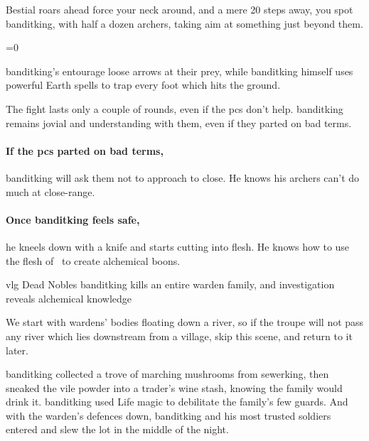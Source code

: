 \begin{boxtext}
  Bestial roars ahead force your neck around, and a mere 20 \glspl{step} away, you spot \gls{banditking}, with half a dozen archers, taking aim at something just beyond them.
\end{boxtext}

\ifnum\value{temperature}=0
  \griffin
\else
  \basilisk
\fi

\Gls{banditking}'s entourage loose arrows at their prey, while \gls{banditking} himself uses powerful Earth spells to trap every foot which hits the ground.

The fight lasts only a couple of rounds, even if the \glspl{pc} don't help.
\Gls{banditking} remains jovial and understanding with them, even if they parted on bad terms.

\paragraph{If the \glspl{pc} parted on bad terms,}
\gls{banditking} will ask them not to approach to close.
He knows his archers can't do much at close-range.

\paragraph{Once \gls{banditking} feels safe,}
he kneels down with a knife and starts cutting into flesh.
He knows how to use the flesh of \localMonster\ to create alchemical \glspl{boon}.%

{\gls{vlg} Dead Nobles}%
{\Gls{banditking} kills an entire \gls{warden} family, and investigation reveals alchemical knowledge}%

We start with \glspl{warden}' bodies floating down a river, so if the troupe will not pass any river which lies downstream from a \gls{village}, skip this scene, and return to it later.

\begin{exampletext}
  \Gls{banditking} collected a trove of marching mushrooms from \gls{sewerking}, then sneaked the vile powder into a trader's wine stash, knowing the family would drink it.
  \Gls{banditking} used Life magic to debilitate the family's few guards.
  And with the \gls{warden}'s defences down, \gls{banditking} and his most trusted soldiers entered and slew the lot in the middle of the night.
\end{exampletext}

